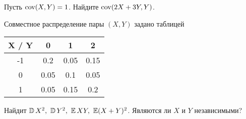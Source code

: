 \begin{problem}
    Пусть $\operatorname{\mathrm{cov}}(X, Y) = 1$.
    Найдите $\operatorname{\mathrm{cov}}(2X + 3Y, Y)$.
\end{problem}


\begin{problem}
    Совместное распределение пары $(X, Y)$ задано таблицей
    \begin{center}
    \begin{tabular}{c|c|c|c}
        X / Y & 0 & 1 & 2 \\
        \hline
        -1 & 0.2 & 0.05 & 0.15 \\
        \hline
        0 & 0.05 & 0.1 & 0.05 \\
        \hline
        1 & 0.05 & 0.15 & 0.2 \\
    \end{tabular}
    \end{center}
    Найдит $\operatorname{\mathbb{D}} X^2,\ \operatorname{\mathbb{D}} Y^2,\ \operatorname{\mathbb{E}} XY,\ \operatorname{\mathbb{E}} (X + Y)^2$.
    Являются ли $X$ и $Y$ независимыми?
\end{problem}



